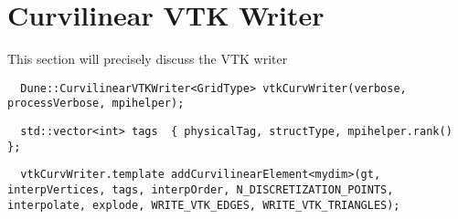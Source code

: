 \section{Curvilinear VTK Writer}
\label{interface-vtk-writer}


This section will precisely discuss the VTK writer

\begin{mybox}
\begin{lstlisting}
  Dune::CurvilinearVTKWriter<GridType> vtkCurvWriter(verbose, processVerbose, mpihelper);
\end{lstlisting}
\end{mybox}

\begin{mybox}
\begin{lstlisting}
  std::vector<int> tags  { physicalTag, structType, mpihelper.rank() };
\end{lstlisting}
\end{mybox}

\begin{mybox}
\begin{lstlisting}
  vtkCurvWriter.template addCurvilinearElement<mydim>(gt, interpVertices, tags, interpOrder, N_DISCRETIZATION_POINTS, interpolate, explode, WRITE_VTK_EDGES, WRITE_VTK_TRIANGLES);
\end{lstlisting}
\end{mybox}